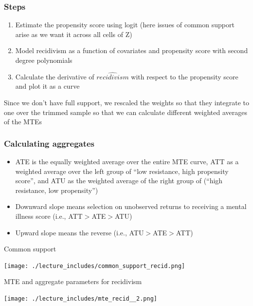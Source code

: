\documentclass{beamer}
\begin{document}
\begin{frame}
\frametitle{Steps}

\begin{enumerate}
\item Estimate the propensity score using logit (here issues of common support arise as we want it across all cells of Z)
\item Model recidivism as a function of covariates and propensity score with second degree polynomials
\item Calculate the derivative of $\widehat{recidivism}$ with respect to the propensity score and plot it as a curve
\end{enumerate}

\bigskip

Since we don't have full support, we rescaled the weights so that they integrate to one over the trimmed sample so that we can calculate different weighted averages of the MTEs


\end{frame}



\begin{frame}
\frametitle{Calculating aggregates}

\begin{itemize}
\item ATE is the equally weighted average over the entire MTE curve, ATT as a weighted average over the left group of ``low resistance, high propensity score'', and ATU as the weighted average of the right group of (``high resistance, low propensity'')
\item Downward slope means selection on unobserved returns to receiving a mental illness score (i.e., ATT$>$ATE$>$ATU)
\item Upward slope means the reverse (i.e., ATU$>$ATE$>$ATT)
\end{itemize}

\end{frame}

\begin{frame}{Common support}

    \texttt{[image: ./lecture\_includes/common\_support\_recid.png]}

\end{frame}

\begin{frame}{MTE and aggregate parameters for recidivism}

    \texttt{[image: ./lecture\_includes/mte\_recid\_\_2.png]}

\end{frame}
\end{document}
